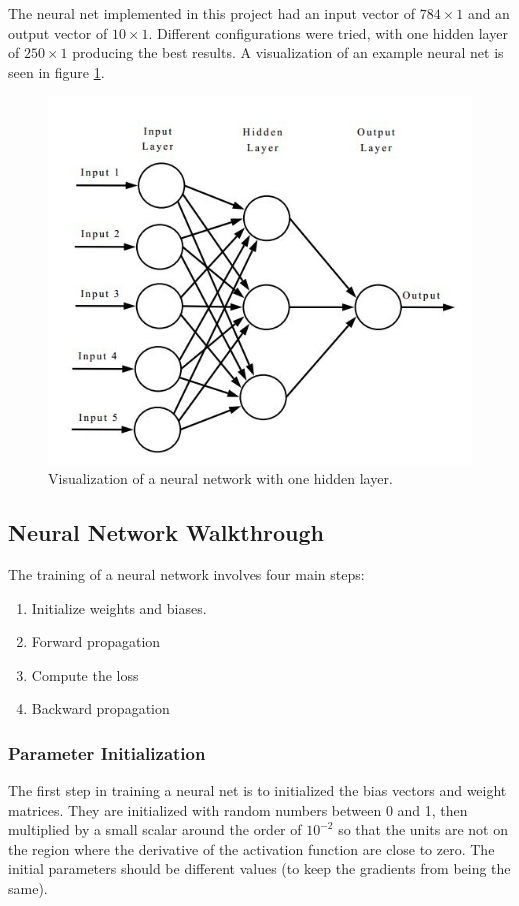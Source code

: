 \documentclass[12pt]{article}
\begin{document}
	The neural net implemented in this project had an input vector of $784\times1$ and an output vector of $10\times1$. Different configurations were tried, with one hidden layer of $250\times1$ producing the best results. A visualization of an example neural net is seen in figure \ref{fig:nndiagram}.
	\begin{figure}
		\centering
		\includegraphics[width=0.6\linewidth]{nnDiagram}
		\caption{Visualization of a neural network with one hidden layer\cite{nnDiagramStack}. }
		\label{fig:nndiagram}
	\end{figure}
	
	
	\subsection{Neural Network Walkthrough}
	
	
	The training of a neural network involves four main steps:
	\begin{enumerate}\singlespacing
		\item Initialize weights and biases. 
		\item Forward propagation
		\item Compute the loss
		\item Backward propagation
	\end{enumerate}%



	\subsubsection{Parameter Initialization}
	The first step in training a neural net is to initialized the bias vectors and weight  matrices. They are initialized with random numbers between 0 and 1, then multiplied by a small scalar around the order of $10^{-2}$ so that the units are not on the region where the derivative of the activation function are close to zero. The initial parameters should be different values (to keep the gradients from being the same).
	
\end{document}
